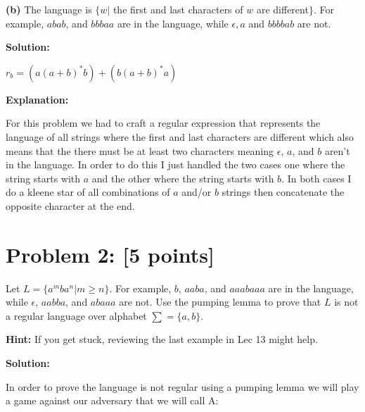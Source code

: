 \documentclass[11pt, letterpaper]{article}
\begin{document}
\vspace{5mm}

\noindent \textbf{(b)} The language is $\{w |$  the first and last characters of $w$ are different$\}$. For example, $abab$, and $bbbaa$ are in the language, while $\epsilon, a$ and $bbbbab$ are not.

\vspace{5mm}

\noindent\textbf{Solution:}
 
\vspace {5mm}

\noindent $r_b = (a(a + b)^*b) + (b(a + b)^*a)$

\vspace {5mm}

\noindent \textbf{Explanation:}

\vspace{5mm}

\noindent For this problem we had to craft a regular expression that represents the language of all strings where the first and last characters are different which also means that the there must be at least two characters meaning $\epsilon$, $a$, and $b$ aren't in the language. In order to do this I just handled the two cases one where the string starts with $a$ and the other where the string starts with $b$. In both cases I do a kleene star of all combinations of $a$ and/or $b$ strings then concatenate the opposite character at the end.

\newpage

\section*{Problem 2: [5 points]}

\noindent Let $L = \{a^mba^n | m \geq n\}$. For example, $b$, $aaba$, and $aaabaaa$ are in the language, while $\epsilon$, $aabba$, and $abaaa$ are not. Use the pumping lemma to prove that $L$ is not a regular language over alphabet $\sum = \{a, b\}$.

\vspace{5mm}

\noindent \textbf{Hint:} If you get stuck, reviewing the last example in Lec 13 might help.

\vspace{5mm}

\noindent\textbf{Solution:}

\vspace{5mm}

\noindent In order to prove the language is not regular using a pumping lemma we will play a game against our adversary that we will call $\mathrm{A}$:
\end{document}
